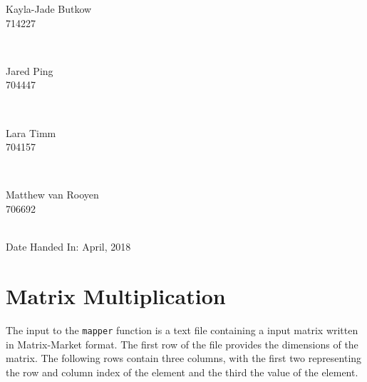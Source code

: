 \documentclass[10pt,twocolumn]{witseiepaper}
\begin{document}
\begin{titlepage}
		
		\begin{minipage}{0.4\textwidth}
			\begin{flushleft} \large
				Kayla-Jade Butkow \\ 714227 %
			\end{flushleft}
		\end{minipage}
		~
		\begin{minipage}{0.4\textwidth}
			\begin{flushright} \large
				Jared Ping \\ 704447
			\end{flushright}
		\end{minipage}\\[1cm]
		
		\begin{minipage}{0.4\textwidth}
			\begin{flushleft} \large
				Lara Timm \\ 704157
			\end{flushleft}
		\end{minipage}
		~
		\begin{minipage}{0.4\textwidth}
			\begin{flushright} \large
				Matthew van Rooyen \\ 706692
			\end{flushright}
		\end{minipage}\\[1cm]
		
		
		
		{\large Date Handed In:  April, 2018}\\[1cm] 
		
	\end{titlepage}


\pagestyle{plain}
\setcounter{page}{1}
\onecolumn
%
\section{Matrix Multiplication}

The input to the \texttt{mapper} function is a text file containing a input matrix written in Matrix-Market format. The first row of the file provides the dimensions of the matrix. The following rows contain three columns, with the first two representing the row and column index of the element and the third the value of the element.
\end{document}
